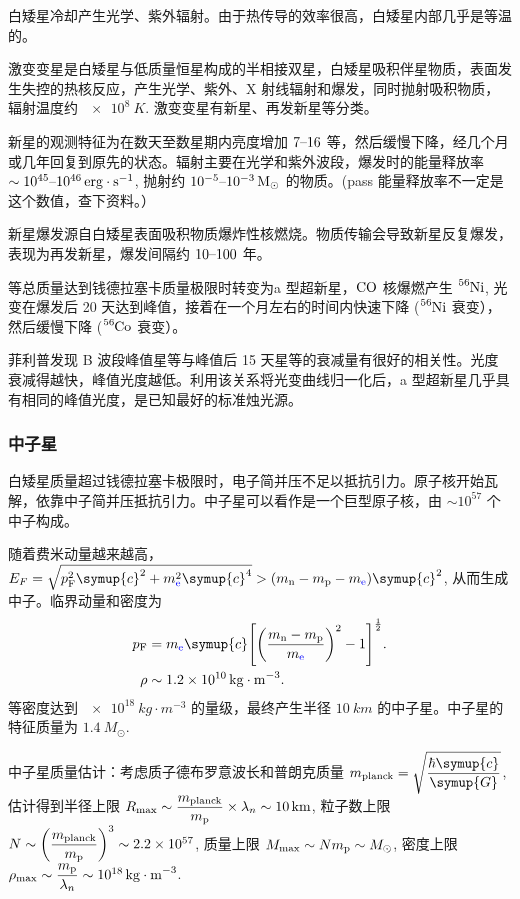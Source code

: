 \documentclass[../天体物理基础.tex]{subfiles}
\begin{document}
白矮星冷却产生光学、紫外辐射。由于热传导的效率很高，白矮星内部几乎是等温的。

激变变星是白矮星与低质量恒星构成的半相接双星，白矮星吸积伴星物质，表面发生失控的热核反应，产生光学、紫外、X 射线辐射和爆发，同时抛射吸积物质，辐射温度约 $\qty{e8}{K}$. 激变变星有新星、再发新星等分类。

新星的观测特征为在数天至数星期内亮度增加 $7\text{\textendash}16$ 等，然后缓慢下降，经几个月或几年回复到原先的状态。辐射主要在光学和紫外波段，爆发时的能量释放率 $\sim10^{45}\text{\textendash}\qty{e46}{erg\cdot{}s^{-1}}$, 抛射约 $10^{-5}\text{\textendash}\qty{e-3}{M_{\odot}}$ 的物质。(pass 能量释放率不一定是这个数值，查下资料。）

新星爆发源自白矮星表面吸积物质爆炸性核燃烧。物质传输会导致新星反复爆发，表现为再发新星，爆发间隔约 $10\text{\textendash}100$ 年。

等总质量达到钱德拉塞卡质量极限时转变为\uppercase\expandafter{}a 型超新星，$\ce{CO}$ 核爆燃产生 $\ce{^{56}Ni}$, 光变在爆发后 20 天达到峰值，接着在一个月左右的时间内快速下降 ($\ce{^{56}Ni}$ 衰变），然后缓慢下降 ($\ce{^{56}Co}$ 衰变）。

菲利普发现 B 波段峰值星等与峰值后 15 天星等的衰减量有很好的相关性。光度衰减得越快，峰值光度越低。利用该关系将光变曲线归一化后，\uppercase\expandafter{}a 型超新星几乎具有相同的峰值光度，是已知最好的标准烛光源。

\subsubsection{中子星}
白矮星质量超过钱德拉塞卡极限时，电子简并压不足以抵抗引力。原子核开始瓦解，依靠中子简并压抵抗引力。中子星可以看作是一个巨型原子核，由 $\sim10^{57}$ 个中子构成。

随着费米动量越来越高，$E_{F}=\sqrt{p_{\mathrm{F}}^{2}\symup{c}^{2}+m_{{\color{blue}{\ce{e}}}}^{2}\symup{c}^{4}}>\mleft(m_{\ce{n}}-m_{\ce{p}}-m_{{\color{blue}{\ce{e}}}}\mright)\symup{c}^{2}$, 从而生成中子。临界动量和密度为
\begin{align}
p_{\mathrm{F}}&=m_{{\color{blue}{\ce{e}}}}\symup{c}\mleft[\mleft(\frac{m_{\ce{n}}-m_{\ce{p}}}{m_{{\color{blue}{\ce{e}}}}}\mright)^{2}-1\mright]^{\frac{1}{2}}.\\
\rho&\sim\qty{1.2e10}{kg\cdot m^{-3}}.
\end{align}
等密度达到 $\qty{e18}{kg\cdot m^{-3}}$ 的量级，最终产生半径 $\qty{10}{km}$ 的中子星。中子星的特征质量为 $\qty{1.4}{M_{\odot}}$.

中子星质量估计：考虑质子德布罗意波长和普朗克质量 $m_{\mathrm{planck}}=\sqrt{\dfrac{\hbar\symup{c}}{\symup{G}}}$, 估计得到半径上限 $R_{\max}\sim\dfrac{m_{\mathrm{planck}}}{m_{\ce{p}}}\times\lambda_{n}\sim\qty{10}{km}$, 粒子数上限 $N\sim\mleft(\dfrac{m_{\mathrm{planck}}}{m_{\ce{p}}}\mright)^{3}\sim2.2\times10^{57}$, 质量上限 $M_{\max}\sim Nm_{\ce{p}}\sim M_{\odot}$, 密度上限 $\rho_{\max}\sim\dfrac{m_{\ce{p}}}{\lambda_{n}}\sim\qty{e18}{kg\cdot m^{-3}}$.
\end{document}

